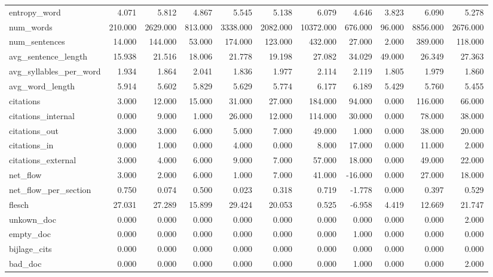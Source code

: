 \begin{tabular}{lrrrrrrrrrr}
\cline{1-11}
entropy\_word & 4.071 & 5.812 & 4.867 & 5.545 & 5.138 & 6.079 & 4.646 & 3.823 & 6.090 & 5.278 \\
\cline{1-11}
num\_words & 210.000 & 2629.000 & 813.000 & 3338.000 & 2082.000 & 10372.000 & 676.000 & 96.000 & 8856.000 & 2676.000 \\
\cline{1-11}
num\_sentences & 14.000 & 144.000 & 53.000 & 174.000 & 123.000 & 432.000 & 27.000 & 2.000 & 389.000 & 118.000 \\
\cline{1-11}
avg\_sentence\_length & 15.938 & 21.516 & 18.006 & 21.778 & 19.198 & 27.082 & 34.029 & 49.000 & 26.349 & 27.363 \\
\cline{1-11}
avg\_syllables\_per\_word & 1.934 & 1.864 & 2.041 & 1.836 & 1.977 & 2.114 & 2.119 & 1.805 & 1.979 & 1.860 \\
\cline{1-11}
avg\_word\_length & 5.914 & 5.602 & 5.829 & 5.629 & 5.774 & 6.177 & 6.189 & 5.429 & 5.760 & 5.455 \\
\cline{1-11}
citations & 3.000 & 12.000 & 15.000 & 31.000 & 27.000 & 184.000 & 94.000 & 0.000 & 116.000 & 66.000 \\
\cline{1-11}
citations\_internal & 0.000 & 9.000 & 1.000 & 26.000 & 12.000 & 114.000 & 30.000 & 0.000 & 78.000 & 38.000 \\
\cline{1-11}
citations\_out & 3.000 & 3.000 & 6.000 & 5.000 & 7.000 & 49.000 & 1.000 & 0.000 & 38.000 & 20.000 \\
\cline{1-11}
citations\_in & 0.000 & 1.000 & 0.000 & 4.000 & 0.000 & 8.000 & 17.000 & 0.000 & 11.000 & 2.000 \\
\cline{1-11}
citations\_external & 3.000 & 4.000 & 6.000 & 9.000 & 7.000 & 57.000 & 18.000 & 0.000 & 49.000 & 22.000 \\
\cline{1-11}
net\_flow & 3.000 & 2.000 & 6.000 & 1.000 & 7.000 & 41.000 & -16.000 & 0.000 & 27.000 & 18.000 \\
\cline{1-11}
net\_flow\_per\_section & 0.750 & 0.074 & 0.500 & 0.023 & 0.318 & 0.719 & -1.778 & 0.000 & 0.397 & 0.529 \\
\cline{1-11}
flesch & 27.031 & 27.289 & 15.899 & 29.424 & 20.053 & 0.525 & -6.958 & 4.419 & 12.669 & 21.747 \\
\cline{1-11}
unkown\_doc & 0.000 & 0.000 & 0.000 & 0.000 & 0.000 & 0.000 & 0.000 & 0.000 & 0.000 & 2.000 \\
\cline{1-11}
empty\_doc & 0.000 & 0.000 & 0.000 & 0.000 & 0.000 & 0.000 & 1.000 & 0.000 & 0.000 & 0.000 \\
\cline{1-11}
bijlage\_cits & 0.000 & 0.000 & 0.000 & 0.000 & 0.000 & 0.000 & 0.000 & 0.000 & 0.000 & 0.000 \\
\cline{1-11}
bad\_doc & 0.000 & 0.000 & 0.000 & 0.000 & 0.000 & 0.000 & 1.000 & 0.000 & 0.000 & 2.000 \\
\cline{1-11}
\bottomrule
\end{tabular}
